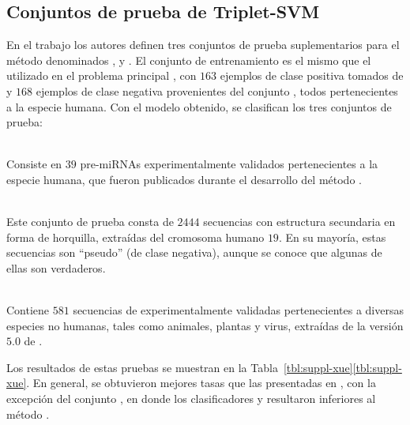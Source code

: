 %
%
\subsection{Conjuntos de prueba de Triplet-SVM}
%
En el trabajo \cite{xue} los autores definen tres conjuntos de prueba
suplementarios para el método \work\tripletsvm{} denominados
,  y .
El conjunto de entrenamiento es el mismo que el utilizado en el
problema principal \prob\tripletsvm{}, con $163$ ejemplos de clase
positiva tomados de  y $168$ ejemplos de clase
negativa provenientes del conjunto , todos pertenecientes
a la especie humana.
Con el modelo obtenido, se clasifican los tres conjuntos de prueba:
%
\begin{description}
  \item{}\\
  Consiste en $39$ pre-miRNAs experimentalmente validados
  pertenecientes a la especie humana, que fueron publicados durante el
  desarrollo del método \work\tripletsvm{}.
%
  \item{}\\
  Este conjunto de prueba consta de $2444$ secuencias con estructura
  secundaria en forma de horquilla, extraídas del cromosoma humano
  $19$. En su mayoría, estas secuencias son ``pseudo'' 
  (de clase negativa), aunque se conoce que algunas de ellas son
   verdaderos.
%
  \item{}\\
  Contiene $581$ secuencias de  experimentalmente
  validadas pertenecientes a diversas especies no humanas, tales como
  animales, plantas y virus, extraídas de la versión $5$.$0$ de
  \dset\mirbase{}.
\end{description}
%
Los resultados de estas pruebas se muestran en la
\iflatexml{}Tabla~\ref{tbl:suppl-xue}\else\autoref{tbl:suppl-xue}\fi.
En general, se obtuvieron mejores tasas que las presentadas en
\cite{xue}, con la excepción del conjunto , en
donde los clasificadores  y  resultaron
inferiores al método \work\tripletsvm{}.
